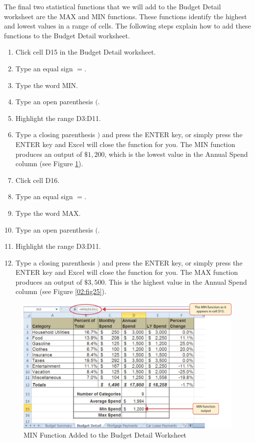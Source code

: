 The final two statistical functions that we will add to the Budget Detail worksheet are the MAX and MIN functions. These functions identify the highest and lowest values in a range of cells. The following steps explain how to add these functions to the Budget Detail worksheet.

\begin{enumerate}
	\item Click cell \textsf{D15} in the Budget Detail worksheet.
	\item Type an equal sign $ = $.
	\item Type the word MIN.
	\item Type an open parenthesis $ ( $.
	\item Highlight the range \textsf{D3:D11}.
	\item Type a closing parenthesis $ ) $ and press the ENTER key, or simply press the ENTER key and Excel will close the function for you. The MIN function produces an output of $ \$1,200 $, which is the lowest value in the Annual Spend column (see Figure \ref{02:fig24}).
	\item Click cell \textsf{D16}.
	\item Type an equal sign $ = $.
	\item Type the word MAX.
	\item Type an open parenthesis $ ( $.
	\item Highlight the range \textsf{D3:D11}.
	\item Type a closing parenthesis $ ) $ and press the ENTER key, or simply press the ENTER key and Excel will close the function for you. The MAX function produces an output of $ \$3,500 $. This is the highest value in the Annual Spend column (see Figure \ref{02:fig25}).
\end{enumerate}

\begin{figure}[H]
	\centering
	\includegraphics[width=\maxwidth{.95\linewidth}]{gfx/ch02_fig24}
	\caption{MIN Function Added to the Budget Detail Worksheet}
	\label{02:fig24}
\end{figure}


